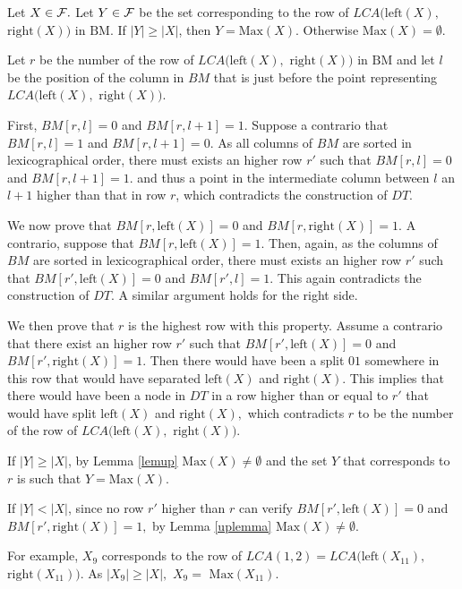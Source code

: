 \documentclass{llncs}
\begin{document}
\begin{proposition}
Let $X\in {\cal F}.$ Let $Y \in {\cal F}$ be the set corresponding to the
row of $LCA(\mbox{left}(X),$ $\mbox{right}(X))$ in $\mbox{BM}.$ If
$|Y|\geq |X|$, then $Y=\mbox{Max}(X).$ Otherwise $\mbox{Max}(X)=\emptyset.$
\end{proposition}
\begin{preuve}
Let $r$ be the number of the row of $LCA(\mbox{left}(X),$
$\mbox{right}(X))$ in $\mbox{BM}$ and let $l$ be the position of the
column in $BM$ that is just before the point representing
$LCA(\mbox{left}(X),$ $\mbox{right}(X)).$

First, $BM[r,l]=0$ and $BM[r,l+1]=1.$ Suppose a contrario that
$BM[r,l]=1$ and $BM[r,l+1]=0.$ As all columns of $BM$ are sorted in
lexicographical order, there must exists an higher row $r'$ such that
$BM[r,l]=0$ and $BM[r,l+1]=1.$ and thus a point in the intermediate
column between $l$ an $l+1$ higher than that in row $r$, which
contradicts the construction of $DT.$

We now prove that $BM[r,\mbox{left}(X)]=0$ and
$BM[r,\mbox{right}(X)]=1.$ A contrario, suppose that
$BM[r,\mbox{left}(X)]=1.$ Then, again, as the columns of $BM$ are
sorted in lexicographical order, there must exists an higher row $r'$
such that $BM[r',\mbox{left}(X)]=0$ and $BM[r',l]=1.$ This again
contradicts the construction of $DT.$ A similar argument holds for the
right side.

We then prove that $r$ is the highest row with this property. Assume a
contrario that there exist an higher row $r'$ such that
$BM[r',\mbox{left}(X)]=0$ and $BM[r',\mbox{right}(X)]=1.$ Then there
would have been a split $01$ somewhere in this row that would have
separated $\mbox{left}(X)$ and $\mbox{right}(X).$ This implies that
there would have been a node in $DT$ in a row higher than or equal to
$r'$ that would have split $\mbox{left}(X)$ and $\mbox{right}(X),$
which contradicts $r$ to be the number of the row of
$LCA(\mbox{left}(X),$ $\mbox{right}(X)).$

If $|Y|\geq |X|$, by Lemma \ref{lemup} $\mbox{Max}(X)\not=\emptyset$ and
the set $Y$ that corresponds to $r$ is such that $Y=\mbox{Max}(X).$

If $|Y|<|X|$, since no row $r'$ higher than $r$ can verify
$BM[r',\mbox{left}(X)]=0$ and $BM[r',\mbox{right}(X)]=1,$ by Lemma
\ref{uplemma} $\mbox{Max}(X)\not=\emptyset.$
\end{preuve}


\noindent
For example, $X_9$ corresponds to the row of $LCA(1,2)=LCA(\mbox{left}(X_{11}),$ $\mbox{right}(X_{11})).$ As
$|X_9|\geq |X|,$ $X_9=$ $\mbox{Max}(X_{11}).$
\end{document}
